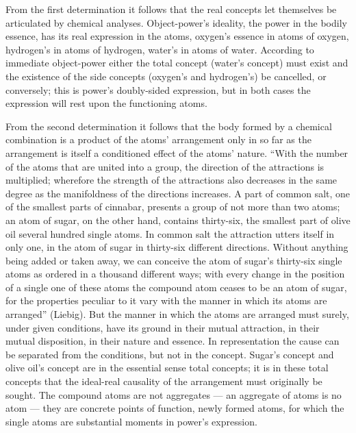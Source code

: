 \documentclass[12pt,a4paper]{book}
\begin{document}
From the first determination it follows that the real concepts let themselves be articulated by chemical analyses.
Object-power's ideality, the power in the bodily essence, has its real expression in the atoms, oxygen's essence in atoms
of oxygen, hydrogen's in atoms of hydrogen, water's in atoms of water. According to immediate object-power either the
total concept (water's concept) must exist and the existence of the side concepts (oxygen's and hydrogen's) be cancelled,
or conversely; this is power's doubly-sided expression, but in both cases the expression will rest upon the functioning
atoms.

From the second determination it follows that the body formed by a chemical combination is a product of the atoms'
arrangement only in so far as the arrangement is itself a conditioned effect of the atoms' nature. ``With the number of
the atoms that are united into a group, the direction of the attractions is multiplied; wherefore the strength of the
attractions also decreases in the same degree as the manifoldness of the directions increases. A part of common salt, one
of the smallest parts of cinnabar, presents a group of not more than two atoms; an atom of sugar, on the other hand,
contains thirty-six, the smallest part of olive oil several hundred single atoms. In common salt the attraction utters
itself in only one, in the atom of sugar in thirty-six different directions. Without anything being added or taken away,
we can conceive the atom of sugar's thirty-six single atoms as ordered in a thousand different ways; with every change in
the position of a single one of these atoms the compound atom ceases to be an atom of sugar, for the properties peculiar
to it vary with the manner in which its atoms are
arranged'' (Liebig). But the manner in which the atoms are arranged must surely, under given conditions, have its ground
in their mutual attraction, in their mutual disposition, in their nature and essence. In representation the cause can be
separated from the conditions, but not in the concept. Sugar's concept and olive oil's concept are in the essential sense
total concepts; it is in these total concepts that the ideal-real causality of the arrangement must originally be sought.
The compound atoms are not aggregates --- an aggregate of atoms is no atom --- they are concrete points of function,
newly formed atoms, for which the single atoms are substantial moments in power's expression.
\end{document}
